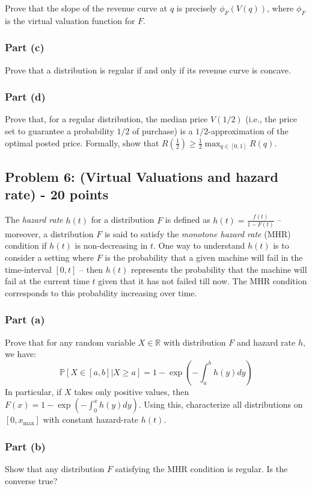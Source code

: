 \documentclass[letterpaper,11pt]{article}
\begin{document}
Prove that the slope of the revenue curve at $q$ is precisely $\phi_F(V(q))$, where $\phi_F$ is the virtual valuation function for $F$. 

\subsubsection*{Part (c)} 
Prove that a distribution is regular if and only if its revenue curve is concave. 

\subsubsection*{Part (d)} 
Prove that, for a regular distribution, the median price $V(1/2)$ (i.e., the price set to guarantee a probability $1/2$ of purchase) is a $1/2$-approximation of the optimal posted price. Formally, show that $R(\frac{1}{2})\geq \frac{1}{2}\max_{q\in[0,1]}R(q)$.


\subsection*{Problem 6: (Virtual Valuations and hazard rate) - 20 points}

The \emph{hazard rate} $h(t)$ for a distribution $F$ is defined as $h(t)=\frac{f(t)}{1-F(t)}$ -- moreover, a distribution $F$ is said to satisfy the \emph{monotone hazard rate} (MHR) condition if $h(t)$ is non-decreasing in $t$. One way to understand $h(t)$ is to consider a setting where $F$ is the probability that a given machine will fail in the time-interval $[0,t]$ -- then $h(t)$ represents the probability that the machine will fail at the current time $t$ given that it has not failed till now. The MHR condition corresponds to this probability increasing over time.

\subsubsection*{Part (a)} 
Prove that for any random variable $X\in\mathbb{R}$ with distribution $F$ and hazard rate $h$, we have:
$$\mathbb{P}\left[\left.X\in[a,b]\right|X\geq a\right] = 1 - \exp{\left(-\int_a^bh(y)dy\right)}$$
In particular, if $X$ takes only positive values, then $F(x)=1-\exp{\left(-\int_0^xh(y)dy\right)}$. Using this, characterize all distributions on $[0,x_{\max}]$ with constant hazard-rate $h(t)$.

\subsubsection*{Part (b)} 
Show that any distribution $F$ satisfying the MHR condition is regular. Is the converse true?
\end{document}
